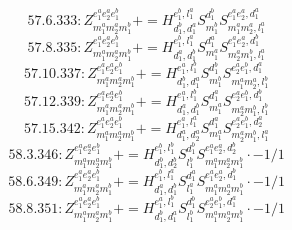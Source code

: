 \documentclass[letterpaper,10pt,fleqn,leqno,onecolumn]{article}
\begin{document}
\begin{equation} \;\;\;\;\;\;  57.6.333: Z^{e_{1}^{a}e_{2}^{a}e_{1}^{b}}_{m_{1}^{a}m_{2}^{a}m_{1}^{b}}+=H^{e_{1}^{b},l_{1}^{a}}_{d_{1}^{b},d_{1}^{a}}S^{d_{1}^{b}}_{m_{1}^{b}}S^{e_{1}^{a}e_{2}^{a},d_{1}^{a}}_{m_{1}^{a}m_{2}^{a},l_{1}^{a}} \end{equation}
\begin{equation} \;\;\;\;\;\;  57.8.335: Z^{e_{1}^{a}e_{2}^{a}e_{1}^{b}}_{m_{1}^{a}m_{2}^{a}m_{1}^{b}}+=H^{e_{1}^{b},l_{1}^{a}}_{d_{1}^{a},d_{1}^{b}}S^{d_{1}^{a}}_{m_{1}^{a}}S^{e_{1}^{a}e_{2}^{a},d_{1}^{b}}_{m_{2}^{a}m_{1}^{b},l_{1}^{a}} \end{equation}
\begin{equation} \;\;\;\;\;\;  57.10.337: Z^{e_{1}^{a}e_{2}^{a}e_{1}^{b}}_{m_{1}^{a}m_{2}^{a}m_{1}^{b}}+=H^{e_{1}^{a},l_{1}^{b}}_{d_{1}^{b},d_{1}^{a}}S^{d_{1}^{b}}_{m_{1}^{b}}S^{e_{2}^{a}e_{1}^{b},d_{1}^{a}}_{m_{1}^{a}m_{2}^{a},l_{1}^{b}} \end{equation}
\begin{equation} \;\;\;\;\;\;  57.12.339: Z^{e_{1}^{a}e_{2}^{a}e_{1}^{b}}_{m_{1}^{a}m_{2}^{a}m_{1}^{b}}+=H^{e_{1}^{a},l_{1}^{b}}_{d_{1}^{a},d_{1}^{b}}S^{d_{1}^{a}}_{m_{1}^{a}}S^{e_{2}^{a}e_{1}^{b},d_{1}^{b}}_{m_{2}^{a}m_{1}^{b},l_{1}^{b}} \end{equation}
\begin{equation} \;\;\;\;\;\;  57.15.342: Z^{e_{1}^{a}e_{2}^{a}e_{1}^{b}}_{m_{1}^{a}m_{2}^{a}m_{1}^{b}}+=H^{e_{1}^{a},l_{1}^{a}}_{d_{1}^{a},d_{2}^{a}}S^{d_{1}^{a}}_{m_{1}^{a}}S^{e_{2}^{a}e_{1}^{b},d_{2}^{a}}_{m_{2}^{a}m_{1}^{b},l_{1}^{a}} \end{equation}
\begin{equation} \;\;\;\;\;\;  58.3.346: Z^{e_{1}^{a}e_{2}^{a}e_{1}^{b}}_{m_{1}^{a}m_{2}^{a}m_{1}^{b}}+=H^{e_{1}^{b},l_{1}^{b}}_{d_{1}^{b},d_{2}^{b}}S^{d_{1}^{b}}_{l_{1}^{b}}S^{e_{1}^{a}e_{2}^{a},d_{2}^{b}}_{m_{1}^{a}m_{2}^{a}m_{1}^{b}}\cdot -1/1 \end{equation}
\begin{equation} \;\;\;\;\;\;  58.6.349: Z^{e_{1}^{a}e_{2}^{a}e_{1}^{b}}_{m_{1}^{a}m_{2}^{a}m_{1}^{b}}+=H^{e_{1}^{b},l_{1}^{a}}_{d_{1}^{a},d_{1}^{b}}S^{d_{1}^{a}}_{l_{1}^{a}}S^{e_{1}^{a}e_{2}^{a},d_{1}^{b}}_{m_{1}^{a}m_{2}^{a}m_{1}^{b}}\cdot -1/1 \end{equation}
\begin{equation} \;\;\;\;\;\;  58.8.351: Z^{e_{1}^{a}e_{2}^{a}e_{1}^{b}}_{m_{1}^{a}m_{2}^{a}m_{1}^{b}}+=H^{e_{1}^{a},l_{1}^{b}}_{d_{1}^{b},d_{1}^{a}}S^{d_{1}^{b}}_{l_{1}^{b}}S^{e_{2}^{a}e_{1}^{b},d_{1}^{a}}_{m_{1}^{a}m_{2}^{a}m_{1}^{b}}\cdot -1/1 \end{equation}
\end{document}
